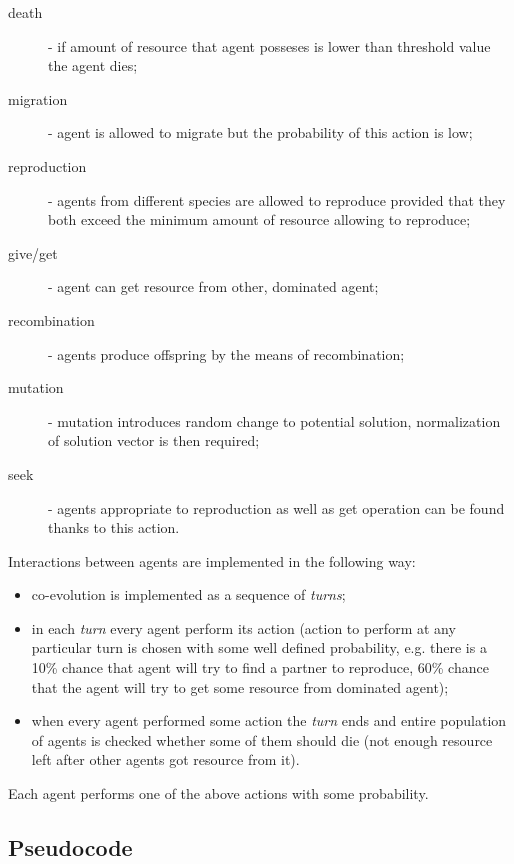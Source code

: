 \begin{description}
  \item [death]
      - if amount of resource that agent posseses is lower than threshold value the agent dies;
  \item [migration]
      - agent is allowed to migrate but the probability of this action is low;
  \item [reproduction]
      - agents from different species are allowed to reproduce provided that they both exceed the minimum amount of resource allowing to reproduce;
  \item [give/get]
      - agent can get resource from other, dominated agent;
  \item [recombination]
      - agents produce offspring by the means of recombination;
  \item [mutation]
      - mutation introduces random change to potential solution, normalization of solution vector is then required;
  \item [seek]
      - agents appropriate  to reproduction as well as get operation can be found thanks to this action.
\end{description}

Interactions between agents are implemented in the following way:
\begin{itemize}
  \item co-evolution is implemented as a sequence of \emph{turns};
  \item in each \emph{turn} every agent perform its action (action to perform at any particular turn is chosen with some well defined probability, e.g. there is a 10\% chance that agent will try to find
	a partner to reproduce, 60\% chance that the agent will try to get some resource from dominated agent);
  \item when every agent performed some action the \emph{turn} ends and entire population of agents is checked whether some of them should die (not enough resource left after other agents got resource
	from it).
\end{itemize}


Each agent performs one of the above actions with some probability.

\subsection{Pseudocode}


% 


